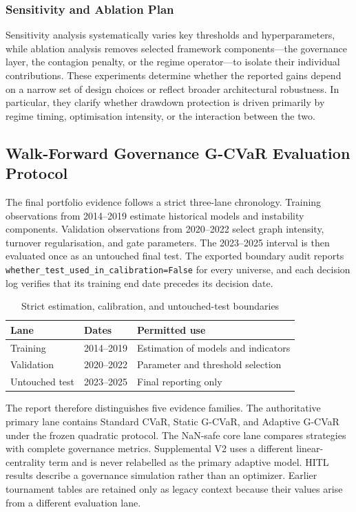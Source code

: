 \documentclass[11pt]{article}
\begin{document}
\subsubsection{Sensitivity and Ablation Plan}
Sensitivity analysis systematically varies key thresholds and hyperparameters, while ablation analysis removes selected framework components---the governance layer, the contagion penalty, or the regime operator---to isolate their individual contributions. These experiments determine whether the reported gains depend on a narrow set of design choices or reflect broader architectural robustness. In particular, they clarify whether drawdown protection is driven primarily by regime timing, optimisation intensity, or the interaction between the two.

\subsection{Walk-Forward Governance G-CVaR Evaluation Protocol}
The final portfolio evidence follows a strict three-lane chronology. Training observations from 2014--2019 estimate historical models and instability components. Validation observations from 2020--2022 select graph intensity, turnover regularisation, and gate parameters. The 2023--2025 interval is then evaluated once as an untouched final test. The exported boundary audit reports \texttt{whether\_test\_used\_in\_calibration=False} for every universe, and each decision log verifies that its training end date precedes its decision date.

\begin{table}[htbp]
\centering
\caption{Strict estimation, calibration, and untouched-test boundaries}
\label{tab:protocol-boundaries}
\begin{tabular}{lll}
\toprule
\textbf{Lane} & \textbf{Dates} & \textbf{Permitted use} \\
\midrule
Training & 2014--2019 & Estimation of models and indicators \\
Validation & 2020--2022 & Parameter and threshold selection \\
Untouched test & 2023--2025 & Final reporting only \\
\bottomrule
\end{tabular}
\end{table}

The report therefore distinguishes five evidence families. The authoritative primary lane contains Standard CVaR, Static G-CVaR, and Adaptive G-CVaR under the frozen quadratic protocol. The NaN-safe core lane compares strategies with complete governance metrics. Supplemental V2 uses a different linear-centrality term and is never relabelled as the primary adaptive model. HITL results describe a governance simulation rather than an optimizer. Earlier tournament tables are retained only as legacy context because their values arise from a different evaluation lane.
\end{document}
